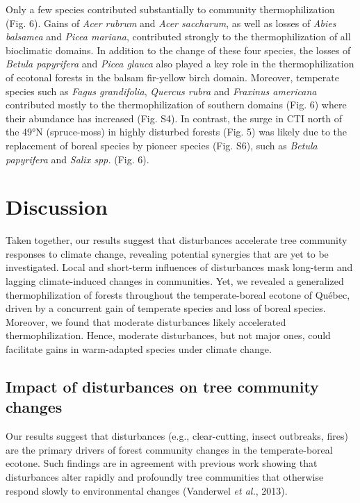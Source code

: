 \documentclass[a4paperpaper,]{article}
\begin{document}
Only a few species contributed substantially to community
thermophilization (Fig. 6). Gains of \emph{Acer rubrum} and \emph{Acer
saccharum}, as well as losses of \emph{Abies balsamea} and \emph{Picea
mariana}, contributed strongly to the thermophilization of all
bioclimatic domains. In addition to the change of these four species,
the losses of \emph{Betula papyrifera} and \emph{Picea glauca} also
played a key role in the thermophilization of ecotonal forests in the
balsam fir-yellow birch domain. Moreover, temperate species such as
\emph{Fagus grandifolia}, \emph{Quercus rubra} and \emph{Fraxinus
americana} contributed mostly to the thermophilization of southern
domains (Fig. 6) where their abundance has increased (Fig. S4). In
contrast, the surge in CTI north of the 49°N (spruce-moss) in highly
disturbed forests (Fig. 5) was likely due to the replacement of boreal
species by pioneer species (Fig. S6), such as \emph{Betula papyrifera}
and \emph{Salix spp.} (Fig. 6).

\hypertarget{discussion}{%
\section{Discussion}\label{discussion}}

Taken together, our results suggest that disturbances accelerate tree
community responses to climate change, revealing potential synergies
that are yet to be investigated. Local and short-term influences of
disturbances mask long-term and lagging climate-induced changes in
communities. Yet, we revealed a generalized thermophilization of forests
throughout the temperate-boreal ecotone of Québec, driven by a
concurrent gain of temperate species and loss of boreal species.
Moreover, we found that moderate disturbances likely accelerated
thermophilization. Hence, moderate disturbances, but not major ones,
could facilitate gains in warm-adapted species under climate change.

\hypertarget{impact-of-disturbances-on-tree-community-changes}{%
\subsection{Impact of disturbances on tree community
changes}\label{impact-of-disturbances-on-tree-community-changes}}

Our results suggest that disturbances (e.g., clear-cutting, insect
outbreaks, fires) are the primary drivers of forest community changes in
the temperate-boreal ecotone. Such findings are in agreement with
previous work showing that disturbances alter rapidly and profoundly
tree communities that otherwise respond slowly to environmental changes
(Vanderwel \emph{et al.}, 2013).
\end{document}
